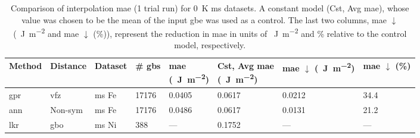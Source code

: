 \documentclass[final,twocolumn,12pt]{elsarticle}
\newcommand{\NA}{---} %
\newcommand{\inpt}{input}
\begin{document}
\begin{table}
\centering
\caption{Comparison of interpolation \gls{mae} (1 trial run) for \SI{0}{\kelvin} \acrfull{ms} datasets. A constant model (Cst, Avg \gls{mae}), whose value was chosen to be the mean of the \inpt{} \gls{gbe} was used as a control. The last two columns, \gls{mae} $\downarrow$ (\SI{}{\J\per\square\meter} and \gls{mae} $\downarrow$ (\%)), represent the reduction in \gls{mae} in units of \SI{}{\J\per\square\meter} and \% relative to the control model, respectively.}
\label{tab:mae-error-simulation}
\begin{tabular}{@{}llllllll@{}}
\toprule
Method &
  Distance &
  Dataset &
  \# \glspl{gb} &
  \thead{\gls{mae} \\   (\SI{}{\J\per\square\meter})} &
  \thead{Cst, Avg \gls{mae} \\   (\SI{}{\J\per\square\meter})} &
  \thead{\gls{mae} $\downarrow$ \\   (\SI{}{\J\per\square\meter})} &
  \thead{\gls{mae}   $\downarrow$ \\ (\%)} \\ \midrule
\gls{gpr}                                            & \acrshort{vfz} & \acrshort{ms} Fe & \num{17176} & \num{0.0405} & \num{0.0617} & \num{0.0212} & \num{34.4} \\
\gls{ann}   \cite{restrepoUsingArtificialNeural2014} & Non-sym        & \acrshort{ms} Fe & \num{17176} & \num{0.0486} & \num{0.0617} & \num{0.0131} & \num{21.2} \\
\gls{lkr}   \cite{chesserLearningGrainBoundary2020}  & \acrshort{gbo} & \acrshort{ms} Ni & \num{388}   & \NA          & \num{0.1752} & \NA          & \NA        \\ \bottomrule
\end{tabular}
\end{table}
\end{document}
